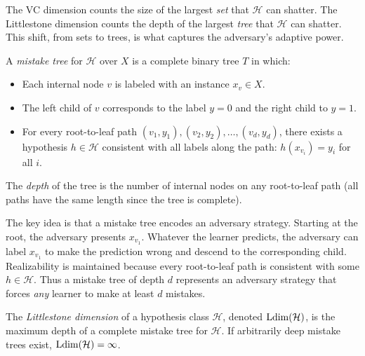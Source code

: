 The VC dimension counts the size of the largest \emph{set} that $\mathcal{H}$ can shatter. The Littlestone dimension counts the depth of the largest \emph{tree} that $\mathcal{H}$ can shatter. This shift, from sets to trees, is what captures the adversary's adaptive power.

\begin{defn}
\label{def:mistake-tree}
  \leanok
A \emph{mistake tree} for $\mathcal{H}$ over $X$ is a complete binary tree $T$ in which:
\begin{itemize}[leftmargin=*, itemsep=2pt]
\item Each internal node $v$ is labeled with an instance $x_v \in X$.
\item The left child of $v$ corresponds to the label $y = 0$ and the right child to $y = 1$.
\item For every root-to-leaf path $(v_1, y_1), (v_2, y_2), \ldots, (v_d, y_d)$, there exists a hypothesis $h \in \mathcal{H}$ consistent with all labels along the path: $h(x_{v_i}) = y_i$ for all $i$.
\end{itemize}
The \emph{depth} of the tree is the number of internal nodes on any root-to-leaf path (all paths have the same length since the tree is complete).
\end{defn}

The key idea is that a mistake tree encodes an adversary strategy. Starting at the root, the adversary presents $x_{v_1}$. Whatever the learner predicts, the adversary can label $x_{v_1}$ to make the prediction wrong and descend to the corresponding child. Realizability is maintained because every root-to-leaf path is consistent with some $h \in \mathcal{H}$. Thus a mistake tree of depth $d$ represents an adversary strategy that forces \emph{any} learner to make at least $d$ mistakes.

\begin{defn}
\label{def:ldim}
  \leanok
The \emph{Littlestone dimension} of a hypothesis class $\mathcal{H}$, denoted $\mathrm{Ldim}(\mathcal{H})$, is the maximum depth of a complete mistake tree for $\mathcal{H}$. If arbitrarily deep mistake trees exist, $\mathrm{Ldim}(\mathcal{H}) = \infty$.
\end{defn}

